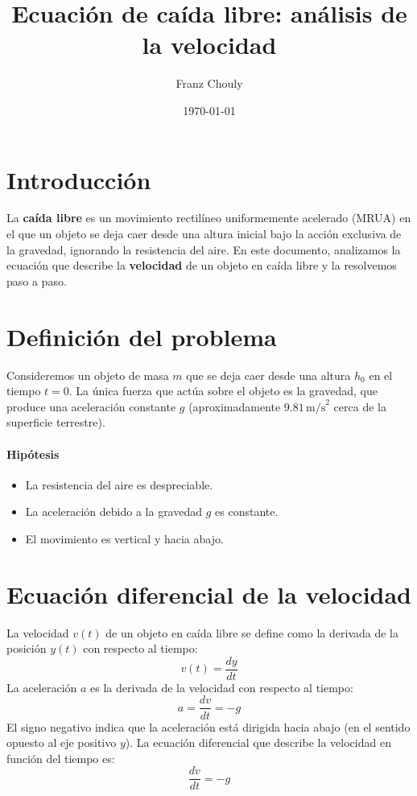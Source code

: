 \documentclass[12pt,a4paper]{article}
\title{\textbf{Ecuación de caída libre: análisis de la velocidad}}
\author{Franz Chouly}
\date{\today}
\begin{document}
\maketitle

\section{Introducción}
La \textbf{caída libre} es un movimiento rectilíneo uniformemente acelerado (MRUA) en el que un objeto se deja caer desde una altura inicial bajo la acción exclusiva de la gravedad, ignorando la resistencia del aire. En este documento, analizamos la ecuación que describe la \textbf{velocidad} de un objeto en caída libre y la resolvemos paso a paso.

\section{Definición del problema}
Consideremos un objeto de masa \( m \) que se deja caer desde una altura \( h_0 \) en el tiempo \( t = 0 \). La única fuerza que actúa sobre el objeto es la gravedad, que produce una aceleración constante \( g \) (aproximadamente \( 9.81 \, \text{m/s}^2 \) cerca de la superficie terrestre).

\paragraph{Hipótesis}
\begin{itemize}
    \item La resistencia del aire es despreciable.
    \item La aceleración debido a la gravedad \( g \) es constante.
    \item El movimiento es vertical y hacia abajo.
\end{itemize}

\section{Ecuación diferencial de la velocidad}
La velocidad \( v(t) \) de un objeto en caída libre se define como la derivada de la posición \( y(t) \) con respecto al tiempo:
\[
v(t) = \frac{dy}{dt}
\]
La aceleración \( a \) es la derivada de la velocidad con respecto al tiempo:
\[
a = \frac{dv}{dt} = -g
\]
El signo negativo indica que la aceleración está dirigida hacia abajo (en el sentido opuesto al eje positivo \( y \)).
%
La ecuación diferencial que describe la velocidad en función del tiempo es:
\[
\frac{dv}{dt} = -g
\]
\end{document}
